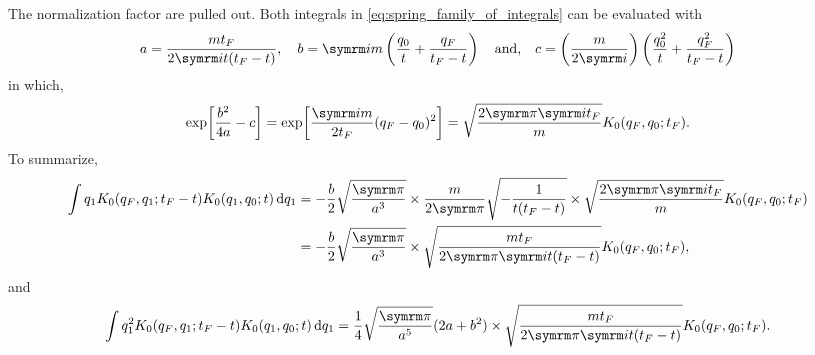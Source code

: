 The normalization factor are pulled out. Both integrals in \cref{eq:spring_family_of_integrals} can be evaluated with
\begin{equation}
    a = \frac{m t_F}{2\im t(t_F - t)}, \quad b = \im m\left(\frac{q_0}{t} + \frac{q_F}{t_F - t}\right) \mathand c = \left(\frac{m}{2\im}\right)\left(\frac{q_0^2}{t} + \frac{q_F^2}{t_F - t}\right)
\end{equation}
in which,
\begin{equation}
    \exp[\frac{b^2}{4a} - c] = \exp[\frac{\im m}{2t_F}(q_F - q_0)^2] = \sqrt{\frac{2\cpi\im t_F}{m}}K_0(q_F, q_0; t_F).
\end{equation}
To summarize,
\begin{align}
    \int q_1K_0(q_F, q_1; t_F - t)K_0(q_1, q_0; t)\dd{q_1} &= -\frac{b}{2}\sqrt{\frac{\cpi}{a^3}}\times\frac{m}{2\cpi}\sqrt{-\frac{1}{t(t_F - t)}}\times\sqrt{\frac{2\cpi\im t_F}{m}}K_0(q_F, q_0; t_F) \nonumber\\
    &= -\frac{b}{2}\sqrt{\frac{\cpi}{a^3}} \times \sqrt{\frac{mt_F}{2\cpi\im t(t_F - t)}}K_0(q_F, q_0; t_F), \label{eq:spring_deg1gaussian_form}
\end{align}
and
\begin{equation}
    \int q_1^2K_0(q_F, q_1; t_F - t)K_0(q_1, q_0; t)\dd{q_1} = \frac{1}{4}\sqrt{\frac{\cpi}{a^5}}(2a + b^2) \times \sqrt{\frac{mt_F}{2\cpi\im t(t_F - t)}}K_0(q_F, q_0; t_F). \label{eq:spring_deg2gaussian_form}
\end{equation}

